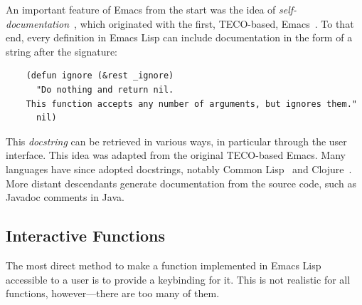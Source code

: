 \documentclass[format=acmsmall,screen]{acmart}
\newcommand \Elisp {Emacs Lisp}
\begin{document}
An important feature of Emacs from the start was the idea of
\emph{self-documentation}~\cite{Stallman1981}, which originated with
the first, TECO-based, Emacs~\cite{Stallman2018-personal}.  To that end, every
definition in \Elisp{} can include documentation in the form of a
string after the signature:
\begin{verbatim}
    (defun ignore (&rest _ignore)
      "Do nothing and return nil.
    This function accepts any number of arguments, but ignores them."
      nil)
\end{verbatim}
This \emph{docstring} can be retrieved in various ways, in particular
through the user interface.  This idea was 
adapted from the original TECO-based Emacs.
Many languages have since adopted docstrings, notably Common
Lisp~\cite{HyperSpec} and Clojure~\cite{ClojureDotOrg}.  More distant
descendants generate documentation from the source code, such as
Javadoc comments in Java.

\subsection{Interactive Functions}
\label{sec:interactive-functions}

The most direct method to make a function implemented in \Elisp{}
accessible to a user is to provide a keybinding for it.  This is not
realistic for all functions, however---there are too many of them.
\end{document}
